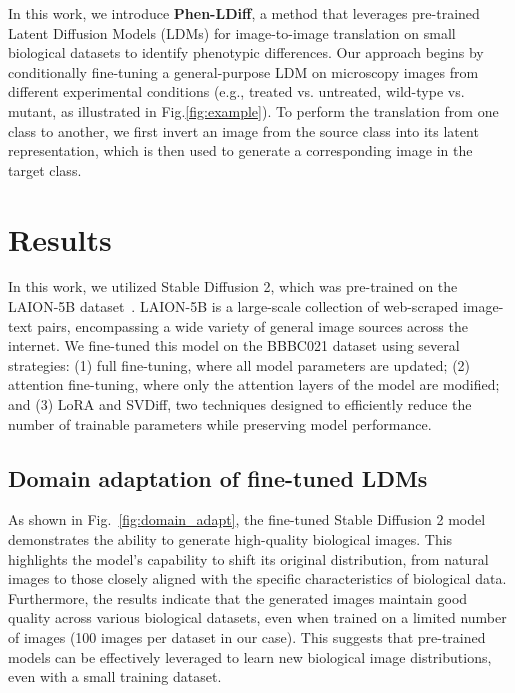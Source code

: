 In this work, we introduce \textbf{Phen-LDiff}, a method that leverages pre-trained Latent Diffusion Models (LDMs) for image-to-image translation on small biological datasets to identify phenotypic differences. Our approach begins by conditionally fine-tuning a general-purpose LDM on microscopy images from different experimental conditions (e.g., treated vs. untreated, wild-type vs. mutant, as illustrated in Fig.\ref{fig:example}). To perform the translation from one class to another, we first invert an image from the source class into its latent representation, which is then used to generate a corresponding image in the target class. 


\section{Results}
In this work, we utilized Stable Diffusion 2, which was pre-trained on the LAION-5B dataset~\cite{LAION_dataset}. LAION-5B is a large-scale collection of web-scraped image-text pairs, encompassing a wide variety of general image sources across the internet. We fine-tuned this model on the BBBC021 dataset using several strategies: (1) full fine-tuning, where all model parameters are updated; (2) attention fine-tuning, where only the attention layers of the model are modified; and (3) LoRA and SVDiff, two techniques designed to efficiently reduce the number of trainable parameters while preserving model performance.



\subsection{Domain adaptation of fine-tuned LDMs}
As shown in Fig.~\ref{fig:domain_adapt}, the fine-tuned Stable Diffusion 2 model demonstrates the ability to generate high-quality biological images. This 
highlights the model's capability to shift its original distribution, from natural images to those closely aligned with the specific characteristics of biological data. Furthermore, the results indicate that the generated images maintain good quality across various biological datasets, even when trained on a limited number of images (100 images per dataset in our case). This suggests that pre-trained models can be effectively leveraged to learn new biological image distributions, even with a small training dataset.

